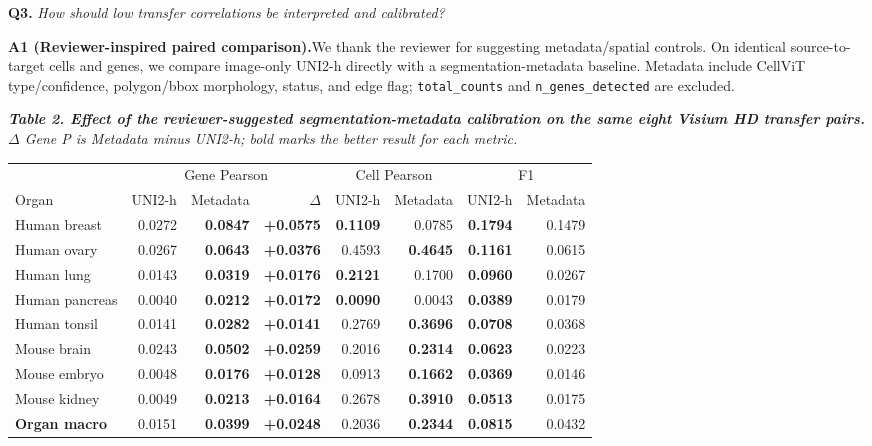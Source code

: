 \documentclass[10pt]{article}
\newcommand{\questionsep}{\par\vspace{0.75em}}
\begin{document}
\questionsep
\textbf{Q3.}\quad
\textit{How should low transfer correlations be interpreted and calibrated?}

\textbf{A1 (Reviewer-inspired paired comparison).}\enspace We thank the
reviewer for suggesting metadata/spatial controls. On identical
source-to-target cells and genes, we compare image-only UNI2-h directly with a
segmentation-metadata baseline. Metadata include CellViT type/confidence,
polygon/bbox morphology, status, and edge flag; \texttt{total\_counts} and
\texttt{n\_genes\_detected} are excluded.

\begin{center}
\begingroup
\scriptsize
\setlength{\tabcolsep}{2.5pt}
\textit{\textbf{Table 2. Effect of the reviewer-suggested segmentation-metadata
calibration on the same eight Visium HD transfer pairs.} \(\Delta\) Gene P is
Metadata minus UNI2-h; bold marks the better result for each metric.}\\[3pt]
\begin{tabular*}{\linewidth}{@{\extracolsep{\fill}}lrrrrrrr@{}}
\toprule
& \multicolumn{3}{c}{Gene Pearson} &
\multicolumn{2}{c}{Cell Pearson} & \multicolumn{2}{c}{F1} \\
\cmidrule(lr){2-4}\cmidrule(lr){5-6}\cmidrule(lr){7-8}
Organ & UNI2-h & Metadata & \(\Delta\) & UNI2-h & Metadata & UNI2-h & Metadata \\
\midrule
Human breast & 0.0272 & \textbf{0.0847} & \textbf{+0.0575} &
\textbf{0.1109} & 0.0785 & \textbf{0.1794} & 0.1479 \\
Human ovary & 0.0267 & \textbf{0.0643} & \textbf{+0.0376} &
0.4593 & \textbf{0.4645} & \textbf{0.1161} & 0.0615 \\
Human lung & 0.0143 & \textbf{0.0319} & \textbf{+0.0176} &
\textbf{0.2121} & 0.1700 & \textbf{0.0960} & 0.0267 \\
Human pancreas & 0.0040 & \textbf{0.0212} & \textbf{+0.0172} &
\textbf{0.0090} & 0.0043 & \textbf{0.0389} & 0.0179 \\
Human tonsil & 0.0141 & \textbf{0.0282} & \textbf{+0.0141} &
0.2769 & \textbf{0.3696} & \textbf{0.0708} & 0.0368 \\
Mouse brain & 0.0243 & \textbf{0.0502} & \textbf{+0.0259} &
0.2016 & \textbf{0.2314} & \textbf{0.0623} & 0.0223 \\
Mouse embryo & 0.0048 & \textbf{0.0176} & \textbf{+0.0128} &
0.0913 & \textbf{0.1662} & \textbf{0.0369} & 0.0146 \\
Mouse kidney & 0.0049 & \textbf{0.0213} & \textbf{+0.0164} &
0.2678 & \textbf{0.3910} & \textbf{0.0513} & 0.0175 \\
\midrule
\textbf{Organ macro} & 0.0151 & \textbf{0.0399} & \textbf{+0.0248} &
0.2036 & \textbf{0.2344} & \textbf{0.0815} & 0.0432 \\
\bottomrule
\end{tabular*}
\endgroup
\end{center}
\end{document}
